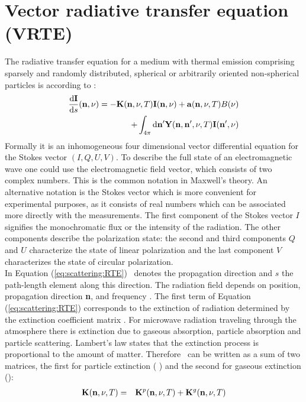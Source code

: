 \newcommand{\DirFre} {(\PDir, \Frq, \Tmp)} \newcommand{\DirFrePr}
{\ensuremath{(\PDir, \PDir^\prime, \Frq, \Tmp)}}


\section{Vector radiative transfer equation (VRTE)}
\label{sec:scattering:general_rte}
 
The radiative transfer equation for a medium with thermal emission
comprising sparsely and randomly distributed, spherical or arbitrarily
oriented non-spherical particles is according to \cite{sree02}:
\begin{eqnarray}
\label{eq:scattering:RTE} 
     \frac{\DiffD \StoVec}{\DiffD s}(\PDir, \Frq) =
     -\ExtMat\DirFre\StoVec(\PDir, \Frq)+\AbsVec\DirFre
     \Planck(\Frq) \\ \nonumber
     +\int_{4\pi} \DiffD \PDir^\prime \SEfMat\DirFrePr
     \StoVec(\PDir^\prime, \Frq) 
\end{eqnarray} 
Formally it is an inhomogeneous four dimensional vector differential
equation for the Stokes vector \StoVec $(I,Q,U,V)$. To describe the
full state of an electromagnetic wave one could use the
electromagnetic field vector, which consists of two complex numbers.
This is the common notation in Maxwell's theory. An alternative
notation is the Stokes vector which is more convenient for
experimental purposes, as it consists of real numbers which can be
associated more directly with the measurements.  The first component
of the Stokes vector $I$ signifies the monochromatic flux or the
intensity of the radiation. The other components describe the
polarization state: the second and third components $Q$ and $U$
characterize the state of linear polarization and the last component
$V$
characterizes the state of circular polarization.\\
In Equation (\ref{eq:scattering:RTE}) \PDir\ denotes the propagation
direction and \DiffD $s$ the path-length element along this direction.
The radiation field depends on position, propagation direction {\bf
  n}, and frequency \Frq.  \vspace{1ex} The first term of Equation
(\ref{eq:scattering:RTE}) corresponds to the extinction of radiation
determined by the extinction coefficient matrix \ExtMat . For
microwave radiation traveling through the atmosphere there is
extinction due to gaseous absorption, particle absorption and particle
scattering. Lambert's law states that the extinction process is
proportional to the amount of matter. Therefore \ExtMat\ can be
written as a sum of two matrices, the first for particle extinction (
) and the second for gaseous extinction ():
\begin{eqnarray}
  \ExtMat\DirFre &=&
  \aExtMat{p}\DirFre+\aExtMat{g}\DirFre
\end{eqnarray}

